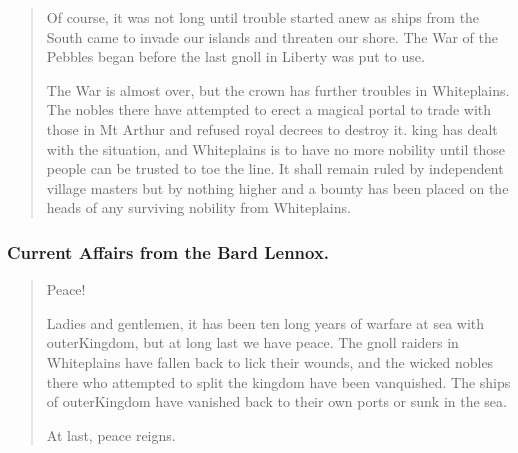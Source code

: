 \begin{multicols}{2}
\begin{quotation}
  Of course, it was not long until trouble started anew as ships from the South came to invade our islands and threaten our shore.
  The War of the Pebbles began before the last gnoll in Liberty was put to use.

  \label{whiteplainsWar}
  The War is almost over, but the crown has further troubles in Whiteplains.
  The nobles there have attempted to erect a magical portal to trade with those in Mt Arthur and refused royal decrees to destroy it.
  \Gls{king} has dealt with the situation, and Whiteplains is to have no more nobility until those people can be trusted to toe the line.
  It shall remain ruled by independent village masters but by nothing higher and a bounty has been placed on the heads of any surviving nobility from Whiteplains.

\end{quotation}

\subsubsection{Current Affairs from the Bard Lennox.}

\begin{quotation}

  Peace!

  Ladies and gentlemen, it has been ten long years of warfare at sea with \gls{outerKingdom}, but at long last we have peace.
  The gnoll raiders in Whiteplains have fallen back to lick their wounds, and the wicked nobles there who attempted to split the kingdom have been vanquished.
  The ships of \gls{outerKingdom} have vanished back to their own ports or sunk in the sea.

  At last, peace reigns.

\end{quotation}

\end{multicols}
